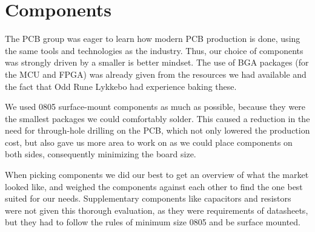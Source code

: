 
\section{Components}

The PCB group was eager to learn how modern PCB production is done, using the
same tools and technologies as the industry. Thus, our choice of components was
strongly driven by a smaller is better mindset. The use of BGA packages (for the
MCU and FPGA) was already given from the resources we had available and the fact
that Odd Rune Lykkebo had experience baking these.

We used 0805 surface-mount components as much as possible, because they were the
smallest packages we could comfortably solder. This caused a reduction in the
need for through-hole drilling on the PCB, which not only lowered the production
cost, but also gave us more area to work on as we could place components on both
sides, consequently minimizing the board size.

When picking components we did our best to get an overview of what the market
looked like, and weighed the components against each other to find the one best
suited for our needs. Supplementary components like capacitors and resistors
were not given this thorough evaluation, as they were requirements of
datasheets, but they had to follow the rules of minimum size 0805 and be surface
mounted.






